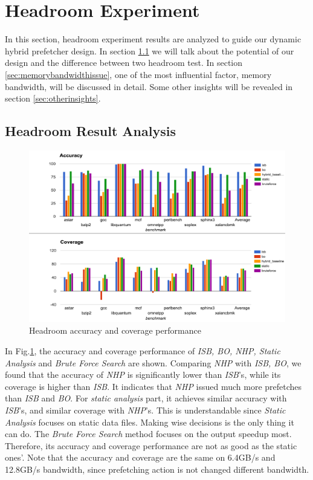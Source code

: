 \section{Headroom Experiment}
\label{sec:headroom}
In this section, headroom experiment results are analyzed to guide our dynamic hybrid prefetcher design. In section \ref{sec:headroomanalysis} we will talk about the potential of our design and the difference between two headroom test. In section \ref{sec:memorybandwidthissue}, one of the most influential factor, memory bandwidth, will be discussed in detail. Some other insights will be revealed in section \ref{sec:otherinsights}.

  \subsection{Headroom Result Analysis}
  \label{sec:headroomanalysis}

  \begin{figure}[ht!]
	   \centering
	   \includegraphics[width=1.0\textwidth]{images/headroom_acc_cov.png}
	   \caption{Headroom accuracy and coverage performance}
	  \label{fig:headroom_acc_cov}
  \end{figure}

  In Fig.\ref{fig:headroom_acc_cov}, the accuracy and coverage performance of \emph{ISB, BO, NHP, Static Analysis} and \emph{Brute Force Search} are shown. Comparing \emph{NHP} with \emph{ISB, BO}, we found that the accuracy of \emph{NHP} is significantly lower than \emph{ISB}'s, while its coverage is higher than \emph{ISB}. It indicates that \emph{NHP} issued much more prefetches than \emph{ISB} and \emph{BO}. For \emph{static analysis} part, it achieves similar accuracy with \emph{ISB}'s, and similar coverage with \emph{NHP}'s. This is understandable since \emph{Static Analysis} focuses on static data files. Making wise decisions is the only thing it can do. The \emph{Brute Force Search} method focuses on the output speedup most. Therefore, its accuracy and coverage performance are not as good as the static ones'. Note that the accuracy and coverage are the same on 6.4GB/s and 12.8GB/s bandwidth, since prefetching action is not changed different bandwidth.

